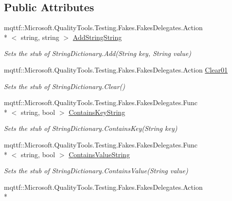 \subsection*{Public Attributes}
\begin{DoxyCompactItemize}
\item 
mqttf\-::\-Microsoft.\-Quality\-Tools.\-Testing.\-Fakes.\-Fakes\-Delegates.\-Action\\*
$<$ string, string $>$ \hyperlink{class_system_1_1_collections_1_1_specialized_1_1_fakes_1_1_stub_string_dictionary_a41859ee3f12c494967dc3e341dbb02bb}{Add\-String\-String}
\begin{DoxyCompactList}\small\item\em Sets the stub of String\-Dictionary.\-Add(\-String key, String value)\end{DoxyCompactList}\item 
mqttf\-::\-Microsoft.\-Quality\-Tools.\-Testing.\-Fakes.\-Fakes\-Delegates.\-Action \hyperlink{class_system_1_1_collections_1_1_specialized_1_1_fakes_1_1_stub_string_dictionary_a2189841a974ce02c4ba0471a6c926539}{Clear01}
\begin{DoxyCompactList}\small\item\em Sets the stub of String\-Dictionary.\-Clear()\end{DoxyCompactList}\item 
mqttf\-::\-Microsoft.\-Quality\-Tools.\-Testing.\-Fakes.\-Fakes\-Delegates.\-Func\\*
$<$ string, bool $>$ \hyperlink{class_system_1_1_collections_1_1_specialized_1_1_fakes_1_1_stub_string_dictionary_aaed3c24359e355e610e14cb9f2b5f1dd}{Contains\-Key\-String}
\begin{DoxyCompactList}\small\item\em Sets the stub of String\-Dictionary.\-Contains\-Key(\-String key)\end{DoxyCompactList}\item 
mqttf\-::\-Microsoft.\-Quality\-Tools.\-Testing.\-Fakes.\-Fakes\-Delegates.\-Func\\*
$<$ string, bool $>$ \hyperlink{class_system_1_1_collections_1_1_specialized_1_1_fakes_1_1_stub_string_dictionary_a12b989ba7d1483496005597ad7b3f91a}{Contains\-Value\-String}
\begin{DoxyCompactList}\small\item\em Sets the stub of String\-Dictionary.\-Contains\-Value(\-String value)\end{DoxyCompactList}\item 
mqttf\-::\-Microsoft.\-Quality\-Tools.\-Testing.\-Fakes.\-Fakes\-Delegates.\-Action\\*

\end{DoxyCompactItemize}
